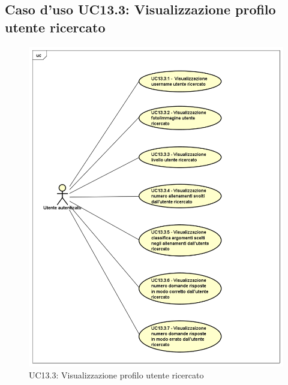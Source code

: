 \subsection{Caso d'uso UC13.3: Visualizzazione profilo utente ricercato}
\label{UC13.3}
\begin{figure}[h]
	\centering
	\includegraphics[scale=0.5]{UML/UC13_3.png}
	\caption{UC13.3: Visualizzazione profilo utente ricercato}
\end{figure}
\FloatBarrier
